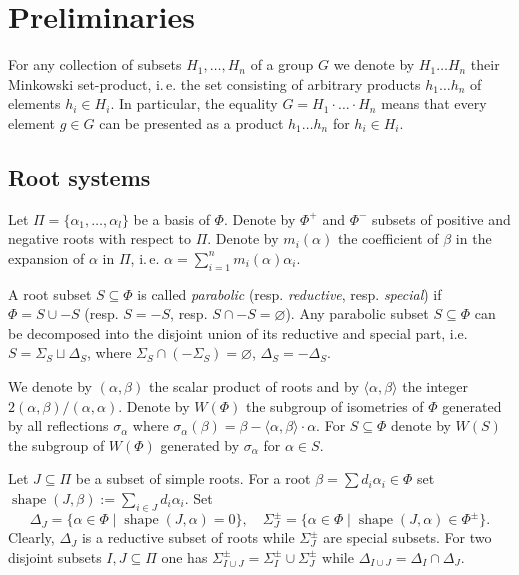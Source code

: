 \documentclass[12pt]{amsart}
\numberwithin{equation}{section}
\theoremstyle{definition}
\DeclareMathOperator{\shape}{shape}
\begin{document}
\section{Preliminaries}\label{sec:prelim}
For any collection of subsets $H_1,\ldots, H_n$ of a group $G$ we denote by $H_1\ldots H_n$ their Minkowski set-product,
i.\,e. the set consisting of arbitrary products $h_1\ldots h_n$ of elements $h_i\in H_i$. In particular, the equality
$G = H_1\cdot\ldots\cdot H_n$ means that every element $g\in G$ can be presented as a product $h_1\ldots h_n$ for $h_i\in H_i$.

\subsection{Root systems}
Let $\Pi=\{\alpha_1, \ldots, \alpha_l\}$ be a basis of $\Phi$. Denote by $\Phi^+$ and $\Phi^-$ subsets of positive and negative roots with respect to $\Pi$.
Denote by $m_i(\alpha)$ the coefficient of $\beta$ in the expansion of $\alpha$ in $\Pi$, i.\,e. $\alpha = \sum\limits_{i=1}^n m_i(\alpha) \alpha_i$.

A root subset $S\subseteq \Phi$ is called {\it parabolic} (resp. {\it reductive}, resp. {\it special}) if $\Phi=S \cup -S$ (resp. $S = -S$, resp. $S \cap -S=\varnothing$).
Any parabolic subset $S \subseteq \Phi$ can be decomposed into the disjoint union of its reductive and special part, i.e. 
$S = \Sigma_S \sqcup \Delta_S$, where $\Sigma_S \cap (-\Sigma_S) = \varnothing$, $\Delta_S = -\Delta_S$.

We denote by $(\alpha, \beta)$ the scalar product of roots and by $\langle \alpha, \beta\rangle$ the integer $2(\alpha, \beta)/(\alpha, \alpha)$.
Denote by $W(\Phi)$ the subgroup of isometries of $\Phi$ generated by all reflections $\sigma_\alpha$ where $\sigma_\alpha(\beta)=\beta-\langle\alpha,\beta \rangle\cdot \alpha$.
For $S\subseteq \Phi$ denote by $W(S)$ the subgroup of $W(\Phi)$ generated by $\sigma_\alpha$ for $\alpha\in S$.

Let $J\subseteq \Pi$ be a subset of simple roots. 
For a root $\beta = \sum d_i\alpha_i \in \Phi$ set $\shape(J, \beta):=\sum\limits_{i\in J}d_i \alpha_i$.
Set $$\Delta_J = \{\alpha \in \Phi \mid \shape(J, \alpha)=0\},\quad \Sigma^\pm_J = \{\alpha \in \Phi \mid \shape(J, \alpha)\in\Phi^\pm \}.$$
Clearly, $\Delta_J$ is a reductive subset of roots while $\Sigma^\pm_J$ are special subsets.
For two disjoint subsets $I, J\subseteq \Pi$ one has $\Sigma^\pm_{I \cup J} = \Sigma^\pm_I\cup\Sigma^\pm_J$ while $\Delta_{I\cup J} = \Delta_I \cap \Delta_J$.
\end{document}
